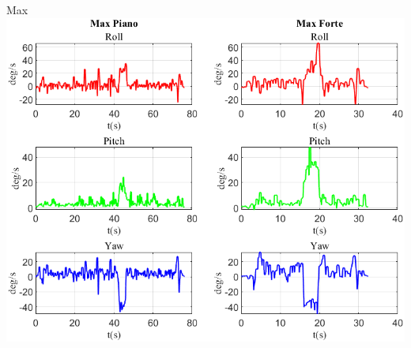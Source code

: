 \documentclass[beamer]{standalone}
\begin{document}
	\begin{frame}{{Max}}
		\centering\includegraphics[height=.8\textheight]{figure/VAng/Max}
	\end{frame}
	
	
	
%	
%	
%	
%	
%	
	
\end{document}
